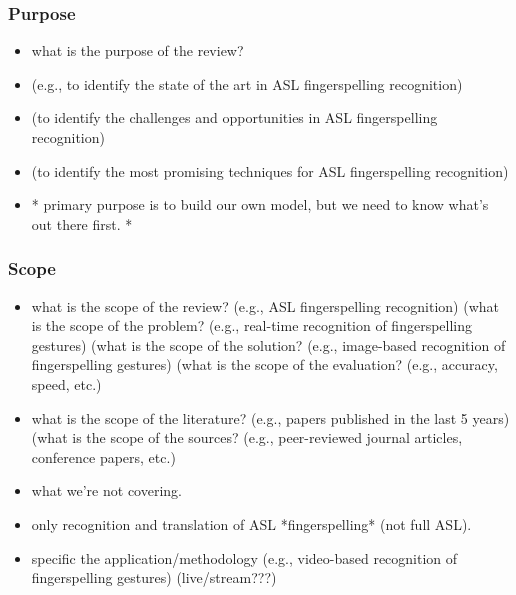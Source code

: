 \subsubsection{Purpose}

\begin{itemize}
    \item what is the purpose of the review?
    \item (e.g., to identify the state of the art in ASL fingerspelling recognition)
    \item (to identify the challenges and opportunities in ASL fingerspelling recognition)
    \item (to identify the most promising techniques for ASL fingerspelling recognition)
    \item * primary purpose is to build our own model, but we need to know what's out there first. *

\end{itemize}
\subsubsection{Scope}
\begin{itemize}
    \item what is the scope of the review? (e.g., ASL fingerspelling recognition) (what is the scope of the problem? (e.g., real-time recognition of fingerspelling gestures) (what is the scope of the solution? (e.g., image-based recognition of fingerspelling gestures) (what is the scope of the evaluation? (e.g., accuracy, speed, etc.)
    \item what is the scope of the literature? (e.g., papers published in the last 5 years) (what is the scope of the sources? (e.g., peer-reviewed journal articles, conference papers, etc.)
    \item what we're not covering.
    \item only recognition and translation of ASL *fingerspelling* (not full ASL).
    \item specific the application/methodology (e.g., video-based recognition of fingerspelling gestures) (live/stream???)
\end{itemize}

